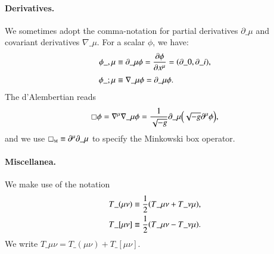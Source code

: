 




\paragraph{Derivatives.} 
We sometimes adopt the comma-notation for partial derivatives $\partial\_\mu$ and covariant derivatives $\nabla\_\mu$. For a scalar $\phi$, we have:
\begin{subequations}
    \begin{align}
        \phi\_{,\mu} &\equiv \partial\_\mu \phi = \pdv{\phi}{x\^\mu} =\pclosed{\partial\_0, \partial\_i }, \\
        \phi\_{;\mu} &\equiv \nabla\_\mu \phi = \partial\_\mu \phi . 
    \end{align}
\end{subequations}
The d'Alembertian reads
\begin{equation}
    \sq \phi  = \nabla\^\mu \nabla\_\mu \phi = \frac{1}{\sqrt{-g}} \partial\_\mu \pclosed{ \sqrt{-g} \partial\^\mu \phi},
\end{equation}
and we use $\sq\nped{M} \equiv \partial\^\mu\partial\_\mu$ to specify the Minkowski box operator.


\paragraph{Miscellanea.} %
We make use of the notation
\begin{subequations}
    \begin{align}
        T\_{(\mu\nu)} &\equiv \frac{1}{2} {\left(  T\_{\mu\nu} + T\_{\nu\mu}   \right)}, \\
        T\_{[\mu\nu]} &\equiv \frac{1}{2} {\left(  T\_{\mu\nu} - T\_{\nu\mu}   \right)}.
    \end{align} 
\end{subequations}
We write $T\_{\mu\nu}= T\_{(\mu\nu)} + T\_{[\mu\nu]}$.



